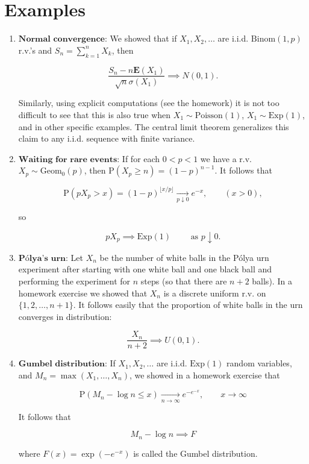 \section{Examples}

\begin{enumerate}[label=\arabic*.]
\item $\textbf{Normal convergence:}$ We showed that if
$X_1,X_2,\ldots$ are i.i.d. $\textrm{Binom}(1,p)$
r.v.'s and $S_n=\sum_{k=1}^n X_k$, then

\[
\frac{S_n-n \mathbf{E}(X_1)}{\sqrt{n} \sigma(X_1)} \implies N(0,1).
\]

\noindent Similarly, using explicit computations (see the
homework) it is not too difficult to see that this is
also true when $X_1\sim \textrm{Poisson}(1)$,
$X_1 \sim \textrm{Exp}(1)$, and in other specific
examples. The central limit theorem generalizes this
claim to any i.i.d. sequence with finite variance.

\item $\textbf{Waiting for rare events:}$ If for each
$0<p<1$ we have a r.v. $X_p \sim \textrm{Geom}_0(p)$,
then $\mathrm{P}(X_p \ge n) = (1-p)^{n-1}$. It
follows that

\[
\mathrm{P}(p X_p > x) = (1-p)^{\lfloor x/p \rfloor} \xrightarrow[p\downarrow 0]{} e^{-x}, \qquad (x > 0),
\]

\noindent so

\[
p X_p \implies \textrm{Exp}(1)\qquad \textrm{ as }p\downarrow 0.
\]

\item $\textbf{Pólya's urn:}$ Let $X_n$ be the number of
white balls in the Pólya urn experiment after starting
with one white ball and one black ball and performing
the experiment for $n$ steps (so that there are $n+2$
balls). In a homework exercise we showed that $X_n$
is a discrete uniform r.v. on $\{1,2,\ldots,n+1\}$.
It follows easily that the proportion of white balls
in the urn converges in distribution:

\[
\frac{X_n}{n+2} \implies U(0,1).
\]

\item $\textbf{Gumbel distribution:}$ If $X_1,X_2,\ldots$
are i.i.d. $\textrm{Exp}(1)$ random variables, and
$M_n=\max(X_1,\ldots,X_n)$, we showed in a homework
exercise that

\[
\mathrm{P}(M_n-\log n \le x) \xrightarrow[n\to\infty]{} e^{-e^{-x}}, \qquad x\to\infty
\]

\noindent It follows that

\[
M_n-\log n \implies F
\]

\noindent where $F(x) = \exp\left(-e^{-x}\right)$ is called the
Gumbel distribution.
\end{enumerate}
